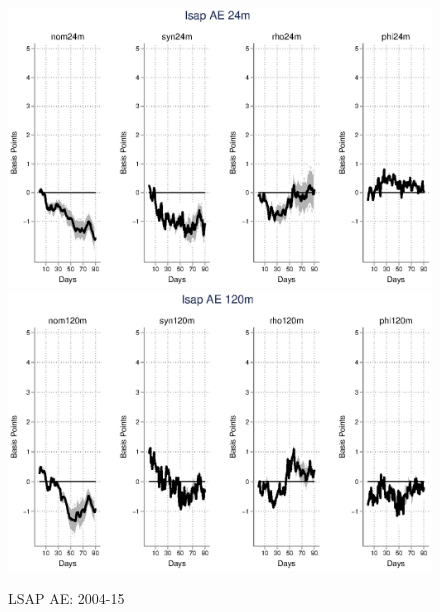 \documentclass{article}
\begin{document}
\begin{figure}[tbph]
	\begin{center}
		\caption{LSAP AE: 2004-15}
		\includegraphics[trim={0cm 0cm 0cm 0cm},clip,height=0.5\textheight,width=1\textwidth]{../LagDep-FX/LSAP/AE/LSAPAE24m.eps} \\
		\includegraphics[trim={0cm 0cm 0cm 0cm},clip,height=0.5\textheight,width=1\textwidth]{../LagDep-FX/LSAP/AE/LSAPAE120m.eps} \\
	\end{center}
\end{figure}

\pagebreak[4]
\end{document}
